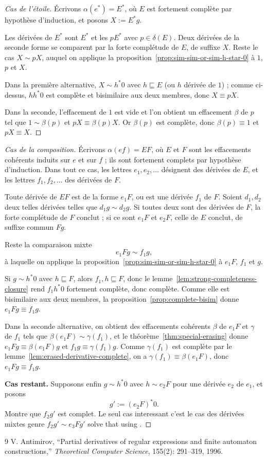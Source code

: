 \documentclass{article}
\begin{document}
\begin{proof}[Cas de l'étoile]
Écrivons $\alpha(e^*)=E^*$, où $E$ est fortement complète par hypothèse
d'induction, et posons $X:=E^*g$.

Les dérivées de $E^*$ sont $E^*$ et les $pE^*$ avec $p\in\delta(E)$. Deux
dérivées de la seconde forme se comparent par la forte complétude de $E$, de
suffixe $X$. Reste le cas $X\sim pX$, auquel on applique la
proposition~\ref{prop:sim-sim-or-sim-h-star-0} à $1$, $p$ et $X$.

Dans la première alternative, $X\sim h^*0$ avec $h\sqsubseteq E$ (ou $h$
dérivée de $1$) ; comme ci-dessus, $hh^*0$ est complète et bisimilaire aux deux
membres, donc $X\equiv pX$.

Dans la seconde, l'effacement de $1$ est vide et l'on obtient un effacement
$\beta$ de $p$ tel que $1\sim\beta(p)$ et $pX\equiv\beta(p)X$. Or $\beta(p)$
est complète, donc $\beta(p)\equiv1$ et $pX\equiv X$.
\end{proof}

\begin{proof}[Cas de la composition]
Écrivons $\alpha(ef)=EF$, où $E$ et $F$ sont les effacements cohérents
induits sur $e$ et sur $f$ ; ils sont fortement complets par hypothèse
d'induction. Dans tout ce cas, les lettres $e_1,e_2,\dots$ désignent des
dérivées de $E$, et les lettres $f_1,f_2,\dots$ des dérivées de $F$.

Toute dérivée de $EF$ est de la forme $e_1F$, ou est une dérivée $f_1$ de $F$.
Soient $d_1,d_2$ deux telles dérivées telles que $d_1g\sim d_2g$. Si toutes deux
sont des dérivées de $F$, la forte complétude de $F$ conclut ; si ce sont $e_1F$
et $e_2F$, celle de $E$ conclut, de suffixe commun $Fg$.

Reste la comparaison mixte
\[
  e_1Fg\sim f_1g,
\]
à laquelle on applique la proposition~\ref{prop:sim-sim-or-sim-h-star-0} à
$e_1F$, $f_1$ et $g$.

Si $g\sim h^*0$ avec $h\sqsubseteq F$, alors $f_1,h\sqsubseteq F$, donc le
lemme~\ref{lem:strong-completeness-closure} rend $f_1h^*0$ fortement complète,
donc complète. Comme elle est bisimilaire aux deux membres, la
proposition~\ref{prop:complete-bisim} donne $e_1Fg\equiv f_1g$.

Dans la seconde alternative, on obtient des effacements cohérents $\beta$ de
$e_1F$ et $\gamma$ de $f_1$ tels que $\beta(e_1F)\sim\gamma(f_1)$, et le
théorème~\ref{thm:special-erasing} donne $e_1Fg\equiv\beta(e_1F)g$ et
$f_1g\equiv\gamma(f_1)g$. Comme $\gamma(f_1)$ est complète par le
lemme~\ref{lem:erased-derivative-complete}, on a
$\gamma(f_1)\equiv\beta(e_1F)$, donc $e_1Fg\equiv f_1g$.

\smallskip
\noindent\textbf{Cas restant.}
Supposons enfin $g\sim h^*0$ avec $h\sim e_2F$ pour une dérivée $e_2$ de $e_1$,
et posons
\[
  g':=(e_2F)^*0.
\]
Montre que $f_2g'$ est complet. Le seul cas interessant c'est le cas des dérivées mixtes genre $f_2g'\sim e_3Fg'$ solve that using \label{prop:complete-bisim-arity-zero}.
\end{proof}

  \begin{thebibliography}{9}
V. Antimirov, ``Partial derivatives of regular expressions and finite automaton constructions,'' \emph{Theoretical Computer Science}, 155(2): 291--319, 1996.
\end{thebibliography}
\end{document}
